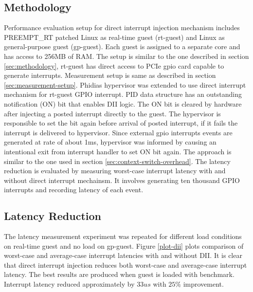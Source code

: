 


\subsection{Methodology}
Performance evaluation setup for direct interrupt injection mechanism includes PREEMPT\_RT patched Linux as real-time guest (rt-guest)
and Linux as general-purpose guest (gp-guest). Each guest is assigned to a separate core and has access to 256MB of RAM. The setup is 
similar to the one described in section \ref{sec:methodology}, rt-guest has direct access to PCIe gpio card capable to generate interrupts. 
Measurement setup is same as described in section \ref{sec:measurement-setup}.
Phidias hypervisor was extended to use direct interrupt mechanism for rt-guest GPIO interrupt.
PID data structure has an outstanding notification (ON) bit that enables DII logic. 
The ON bit is cleared by hardware after injecting a posted interrupt directly to the guest. 
The hypervisor is responsible to set the bit again before arrival of posted interrupt, if it fails the interrupt is delivered to hypervisor.
Since external gpio interrupts events are generated at rate of about 1ms, hypervisor was informed by causing an intentional exit from interrupt handler to
set ON bit again. The approach is similar to the one used in section \ref{sec:context-switch-overhead}.
The latency reduction is evaluated by measuring worst-case interrupt latency with and without direct interrupt mechainsm.
It involves generating ten thousand GPIO interrupts and recording latency of each event.

\subsection{Latency Reduction}


The latency measurement experiment was repeated for different load conditions on real-time guest and no load on gp-guest. 
Figure \ref{plot-dii} plots comparison of worst-case and average-case interrupt latencies with and without DII. 
It is clear that direct interrupt injection reduces both worst-case and average-case interrupt latency. 
The best results are produced when guest is loaded with \mcachepressure{} benchmark. 
Interrupt latency reduced approximately by $33us$ with $25\%$ improvement.



